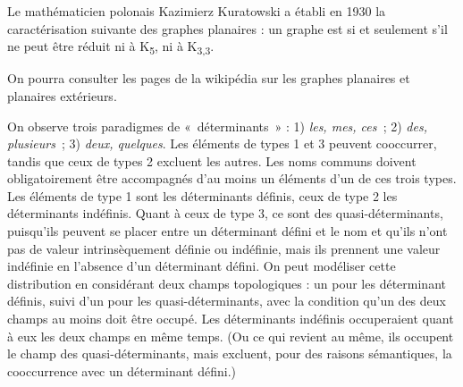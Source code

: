 {    \begin{center}
    \begin{minipage}[c]{.5\linewidth}\centering
    \end{minipage}\begin{minipage}[c]{.5\linewidth}\centering
    \end{minipage}
    \end{center}

    Le mathématicien polonais Kazimierz Kuratowski a établi en 1930 la caractérisation suivante des graphes planaires : un graphe est  si et seulement s’il ne peut être réduit ni à K\textsubscript{5}, ni à K\textsubscript{3,3}.

    On pourra consulter les pages de la wikipédia sur les graphes planaires et planaires extérieurs.

     On observe trois paradigmes de «~déterminants~» : 1) \textit{les, mes, ces~}; 2) \textit{des, plusieurs~}; 3) \textit{deux, quelques}. Les éléments de types 1 et 3 peuvent cooccurrer, tandis que ceux de types 2 excluent les autres. Les noms communs doivent obligatoirement être accompagnés d’au moins un éléments d’un de ces trois types. Les éléments de type 1 sont les déterminants définis, ceux de type 2 les déterminants indéfinis. Quant à ceux de type 3, ce sont des quasi-déterminants, puisqu’ils peuvent se placer entre un déterminant défini et le nom et qu’ils n’ont pas de valeur intrinsèquement définie ou indéfinie, mais ils prennent une valeur indéfinie en l’absence d’un déterminant défini. On peut modéliser cette distribution en considérant deux champs topologiques : un pour les déterminant définis, suivi d’un pour les quasi-déterminants, avec la condition qu’un des deux champs au moins doit être occupé. Les déterminants indéfinis occuperaient quant à eux les deux champs en même temps. (Ou ce qui revient au même, ils occupent le champ des quasi-déterminants, mais excluent, pour des raisons sémantiques, la cooccurrence avec un déterminant défini.)

}

